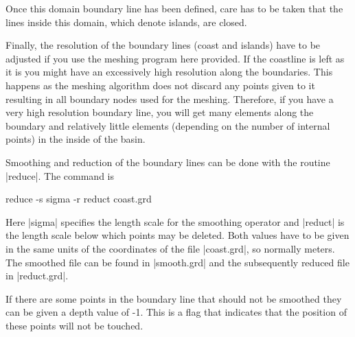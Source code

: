 Once this domain boundary line has been defined, care has
to be taken that the lines inside this domain, which denote
islands, are closed.

Finally, the resolution of the boundary lines (coast and islands)
have to be adjusted if you use the meshing program here provided. 
If the coastline is left as it is you might
have an excessively high resolution along the boundaries. This happens as the 
meshing algorithm does not discard any points given to it resulting in
all boundary nodes used for the meshing.
Therefore, if you have a very high resolution boundary line, you will
get many elements along the boundary and relatively little elements
(depending on the number of internal points) in the inside of the
basin.

Smoothing and reduction of the boundary lines can be done with the
routine |reduce|. The command is

\begin{code}
    reduce -s sigma -r reduct coast.grd
\end{code}

Here |sigma| specifies the length scale for the smoothing operator
and |reduct| is the length scale below which points may be deleted.
Both values have to be given in the same units of the coordinates
of the file |coast.grd|, so normally meters.
The smoothed file can be found in |smooth.grd| and the subsequently
reduced file in |reduct.grd|. 

If there are some points in the boundary line that should not be smoothed
they can be given a depth value of -1. This is a flag that indicates
that the position of these points will not be touched.


